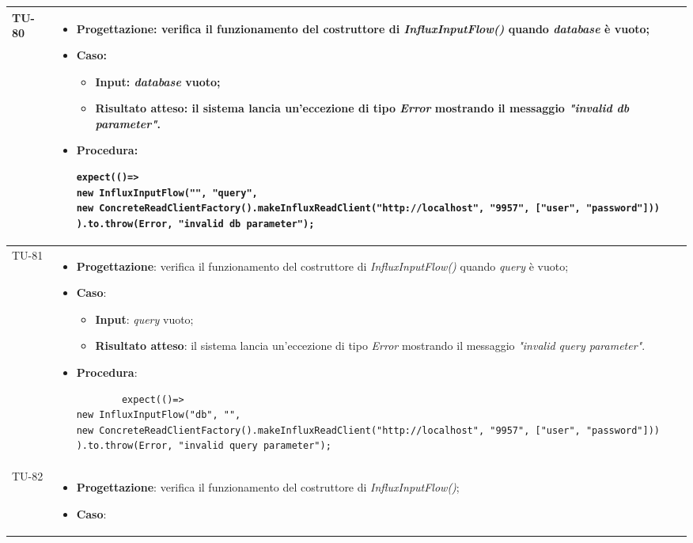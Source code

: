 \begin{longtable}{|C{1.5cm}|C{14.5cm}|}
\hline
{TU-80} &
\begin{itemize}
	\item \textbf{Progettazione}: verifica il funzionamento del costruttore di \emph{InfluxInputFlow()} quando \emph{database} è vuoto;
	\item \textbf{Caso}: 
	\begin{itemize}
		\item \textbf{Input}: \emph{database} vuoto;
		\item \textbf{Risultato atteso}: il sistema lancia un'eccezione di tipo \emph{Error} mostrando il messaggio \emph{"invalid db parameter"}.
	\end{itemize}
	\item \textbf{Procedura}:
	\begin{lstlisting}
expect(()=> 
new InfluxInputFlow("", "query", 
new ConcreteReadClientFactory().makeInfluxReadClient("http://localhost", "9957", ["user", "password"]))
).to.throw(Error, "invalid db parameter");
	\end{lstlisting}
\end{itemize}\\
\hline
{TU-81} &
\begin{itemize}
	\item \textbf{Progettazione}: verifica il funzionamento del costruttore di \emph{InfluxInputFlow()} quando \emph{query} è vuoto;
	\item \textbf{Caso}: 
	\begin{itemize}
		\item \textbf{Input}: \emph{query} vuoto;
		\item \textbf{Risultato atteso}: il sistema lancia un'eccezione di tipo \emph{Error} mostrando il messaggio \emph{"invalid query parameter"}.
	\end{itemize}
	\item \textbf{Procedura}:
	\begin{lstlisting}
        expect(()=> 
new InfluxInputFlow("db", "", 
new ConcreteReadClientFactory().makeInfluxReadClient("http://localhost", "9957", ["user", "password"]))
).to.throw(Error, "invalid query parameter");
	\end{lstlisting}
\end{itemize}\\
\hline
{TU-82} &
\begin{itemize}
	\item \textbf{Progettazione}: verifica il funzionamento del costruttore di \emph{InfluxInputFlow()};
	\item \textbf{Caso}: 

\end{itemize}
\end{longtable}
